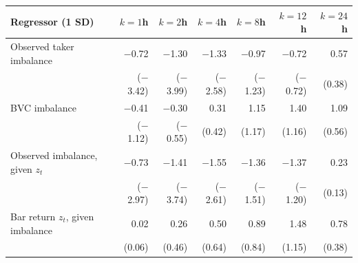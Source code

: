 \begin{tabular}{lrrrrrr}
\toprule
Regressor (1 SD) & $k=1$h & $k=2$h & $k=4$h & $k=8$h & $k=12$h & $k=24$h\\
\midrule
Observed taker imbalance & \ensuremath{-}0.72 & \ensuremath{-}1.30 & \ensuremath{-}1.33 & \ensuremath{-}0.97 & \ensuremath{-}0.72 & 0.57\\
 & (\ensuremath{-}3.42) & (\ensuremath{-}3.99) & (\ensuremath{-}2.58) & (\ensuremath{-}1.23) & (\ensuremath{-}0.72) & (0.38)\\
BVC imbalance & \ensuremath{-}0.41 & \ensuremath{-}0.30 & 0.31 & 1.15 & 1.40 & 1.09\\
 & (\ensuremath{-}1.12) & (\ensuremath{-}0.55) & (0.42) & (1.17) & (1.16) & (0.56)\\
Observed imbalance, given $z_t$ & \ensuremath{-}0.73 & \ensuremath{-}1.41 & \ensuremath{-}1.55 & \ensuremath{-}1.36 & \ensuremath{-}1.37 & 0.23\\
 & (\ensuremath{-}2.97) & (\ensuremath{-}3.74) & (\ensuremath{-}2.61) & (\ensuremath{-}1.51) & (\ensuremath{-}1.20) & (0.13)\\
Bar return $z_t$, given imbalance & 0.02 & 0.26 & 0.50 & 0.89 & 1.48 & 0.78\\
 & (0.06) & (0.46) & (0.64) & (0.84) & (1.15) & (0.38)\\
\bottomrule
\end{tabular}
